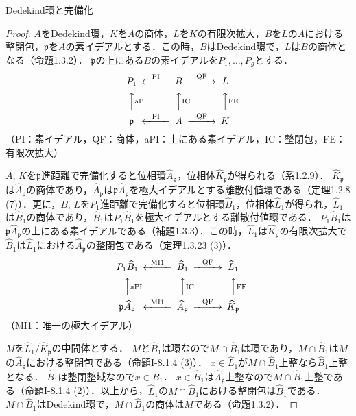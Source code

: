 \begin{screen}
    Dedekind環と完備化
\end{screen}
\begin{proof}
  $A$をDedekind環，$K$を$A$の商体，$L$を$K$の有限次拡大，$B$を$L$の$A$における整閉包，$\mathfrak{p}$を$A$の素イデアルとする．この時，$B$はDedekind環で，$L$は$B$の商体となる（命題1.3.2）．
  $\mathfrak{p}$の上にある$B$の素イデアルを$P_1,\ldots,P_g$とする．
  \[
  \begin{CD}
    P_1            @<\text{PI}<< B @>\text{QF}>> L\\
    @AA\text{aPI}A @AA\text{IC}A   @AA\text{FE}A \\
    \mathfrak{p}   @<\text{PI}<< A @>\text{QF}>> K
  \end{CD}
  \]
  （PI：素イデアル，QF：商体，aPI：上にある素イデアル，IC：整閉包，FE：有限次拡大）

  $A$, $K$を$\mathfrak{p}$進距離で完備化すると位相環$\widehat{A}_\mathfrak{p}$，位相体$\widehat{K}_\mathfrak{p}$が得られる（系1.2.9）．
  $\widehat{K}_\mathfrak{p}$は$\widehat{A}_\mathfrak{p}$の商体であり，$\widehat{A}_\mathfrak{p}$は$\mathfrak{p}\widehat{A}_\mathfrak{p}$を極大イデアルとする離散付値環である（定理1.2.8 (7)）．更に，$B$, $L$を$P_1$進距離で完備化すると位相環$\widehat{B}_1$，位相体$\widehat{L}_1$が得られ，$\widehat{L}_1$は$\widehat{B}_1$の商体であり，$\widehat{B}_1$は$P_1\widehat{B}_1$を極大イデアルとする離散付値環である．
  $P_1\widehat{B}_1$は$\mathfrak{p}\widehat{A}_\mathfrak{p}$の上にある素イデアルである（補題1.3.3）．この時，$\widehat{L}_1$は$\widehat{K}_\mathfrak{p}$の有限次拡大で$\widehat{B}_1$は$\widehat{L}_1$における$\widehat{A}_\mathfrak{p}$の整閉包である（定理1.3.23 (3)）．
  \[
  \begin{CD}
    P_1\widehat{B}_1                     @<\text{MI1}<< \widehat{B}_1            @>\text{QF}>> \widehat{L}_1\\
    @AA\text{aPI}A                   @AA\text{IC}A                      @AA\text{FE}A \\
    \mathfrak{p}\widehat{A}_\mathfrak{p} @<\text{MI1}<< \widehat{A}_\mathfrak{p} @>\text{QF}>> \widehat{K}_\mathfrak{p}
  \end{CD}
  \]
  （MI1：唯一の極大イデアル）

  $M$を$\widehat{L}_1/\widehat{K}_\mathfrak{p}$の中間体とする．
  $M$と$\widehat{B}_1$は環なので$M\cap\widehat{B}_1$は環であり，$M\cap\widehat{B}_1$は$M$の$\widehat{A}_\mathfrak{p}$における整閉包である（命題I-8.1.4 (3)）．
  $x\in\widehat{L}_1$が$M\cap\widehat{B}_1$上整なら$\widehat{B}_1$上整となる．
  $\widehat{B}_1$は整閉整域なので$x\in\widehat{B}_1$．
  $x\in\widehat{B}_1$は$\widehat{A}_\mathfrak{p}$上整なので$M\cap\widehat{B}_1$上整である（命題I-8.1.4 (2)）．以上から，$\widehat{L}_1$の$M\cap\widehat{B}_1$における整閉包は$\widehat{B}_1$である．
  $M\cap\widehat{B}_1$はDedekind環で，$M\cap\widehat{B}_1$の商体は$M$である（命題1.3.2）．


\end{proof}
